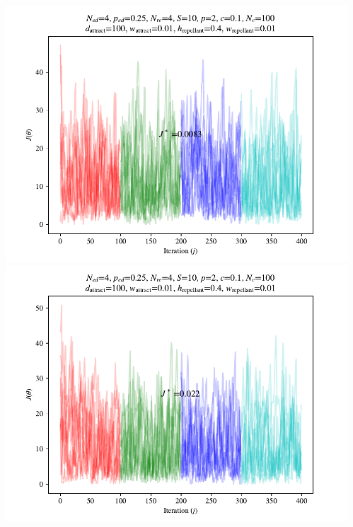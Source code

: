 \documentclass{beamer}
\begin{document}
\begin{frame}
\begin{columns}[T]
\begin{center}
    \end{center}
  \begin{center}
    \includegraphics[scale=0.3]{assets/rastrigin_colony_ed_2_J}
    \includegraphics[scale=0.3]{assets/rastrigin_colony_ed_3_J}
  \end{center}
\end{columns}
\end{frame}
\end{document}
